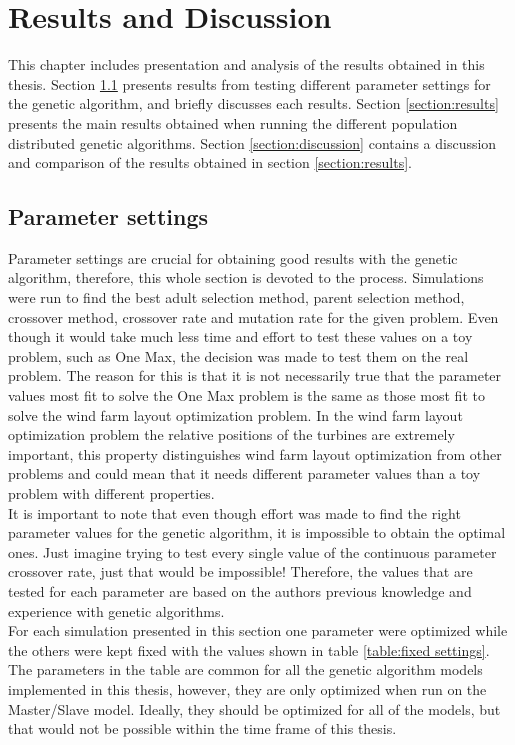 \chapter{Results and Discussion}\label{chapter:results}
This chapter includes presentation and analysis of the results obtained in this thesis. Section \ref{section:parameter settings} presents results from testing different parameter settings for the genetic algorithm, and briefly discusses each results. Section \ref{section:results} presents the main results obtained when running the different population distributed genetic algorithms. Section \ref{section:discussion} contains a discussion and comparison of the results obtained in section \ref{section:results}.


\section{Parameter settings}\label{section:parameter settings}
Parameter settings are crucial for obtaining good results with the genetic algorithm, therefore, this whole section is devoted to the process. Simulations were run to find the best adult selection method, parent selection method, crossover method, crossover rate and mutation rate for the given problem. Even though it would take much less time and effort to test these values on a toy problem, such as One Max, the decision was made to test them on the real problem. The reason for this is that it is not necessarily true that the parameter values most fit to solve the One Max problem is the same as those most fit to solve the wind farm layout optimization problem. In the wind farm layout optimization problem the relative positions of the turbines are extremely important, this property distinguishes wind farm layout optimization from other problems and could mean that it needs different parameter values than a toy problem with different properties.\\

\noindent It is important to note that even though effort was made to find the right parameter values for the genetic algorithm, it is impossible to obtain the optimal ones. Just imagine trying to test every single value of the continuous parameter crossover rate, just that would be impossible! Therefore, the values that are tested for each parameter are based on the authors previous knowledge and experience with genetic algorithms. \\

\noindent For each simulation presented in this section one parameter were optimized while the others were kept fixed with the values shown in table \ref{table:fixed settings}. The parameters in the table are common for all the genetic algorithm models implemented in this thesis, however, they are only optimized when run on the Master/Slave model. Ideally, they should be optimized for all of the models, but that would not be possible within the time frame of this thesis.\\ 

